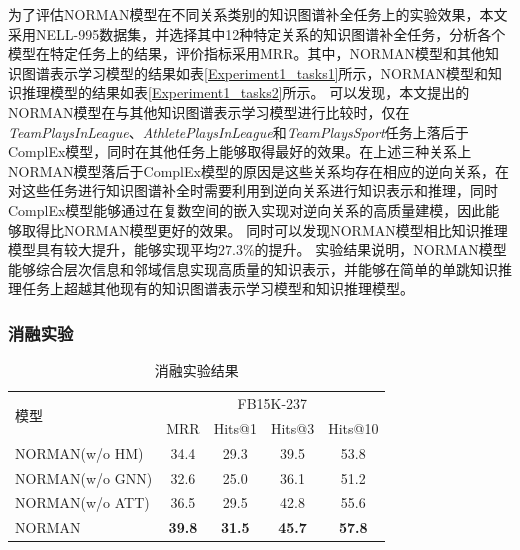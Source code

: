 \documentclass[algorithmlist, AutoFakeBold, AutoFakeSlant, figurelist, tablelist, nomlist, engineering]{seuthesix}
\begin{document}
为了评估NORMAN模型在不同关系类别的知识图谱补全任务上的实验效果，本文采用NELL-995数据集，并选择其中12种特定关系的知识图谱补全任务，分析各个模型在特定任务上的结果，评价指标采用MRR。其中，NORMAN模型和其他知识图谱表示学习模型的结果如表\ref{Experiment1_tasks1}所示，NORMAN模型和知识推理模型的结果如表\ref{Experiment1_tasks2}所示。
可以发现，本文提出的NORMAN模型在与其他知识图谱表示学习模型进行比较时，仅在\textit{TeamPlaysInLeague}、\textit{AthletePlaysInLeague}和\textit{TeamPlaysSport}任务上落后于ComplEx模型，同时在其他任务上能够取得最好的效果。在上述三种关系上NORMAN模型落后于ComplEx模型的原因是这些关系均存在相应的逆向关系，在对这些任务进行知识图谱补全时需要利用到逆向关系进行知识表示和推理，同时ComplEx模型能够通过在复数空间的嵌入实现对逆向关系的高质量建模，因此能够取得比NORMAN模型更好的效果。
同时可以发现NORMAN模型相比知识推理模型具有较大提升，能够实现平均$27.3\%$的提升。
实验结果说明，NORMAN模型能够综合层次信息和邻域信息实现高质量的知识表示，并能够在简单的单跳知识推理任务上超越其他现有的知识图谱表示学习模型和知识推理模型。

\subsubsection{消融实验}
\begin{table}[t]
  \centering
  \caption{消融实验结果}
  \begin{tabular*}{0.95\textwidth}{@{\extracolsep{\fill}}lcccc}
    \toprule[1pt]
    \multirow{2}{*}{模型} & \multicolumn{4}{c}{FB15K-237} \\
      & MRR & Hits@1 & Hits@3 & Hits@10 \\ \hline
    NORMAN(w/o HM) & 34.4 & 29.3 & 39.5 & 53.8 \\
    NORMAN(w/o GNN) & 32.6 & 25.0 & 36.1 & 51.2 \\
    NORMAN(w/o ATT) & 36.5 & 29.5 & 42.8 & 55.6 \\
    NORMAN & \textbf{39.8} & \textbf{31.5} & \textbf{45.7} & \textbf{57.8} \\
    \bottomrule[1pt]
  \end{tabular*}
  \label{Experiment1_ablation}
\end{table}
\end{document}
